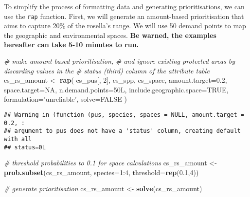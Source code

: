\documentclass[11pt,]{article}
\newenvironment{Shaded}{\begin{snugshade}}{\end{snugshade}}
\newcommand{\KeywordTok}[1]{\textcolor[rgb]{0.13,0.29,0.53}{\textbf{{#1}}}}
\newcommand{\DataTypeTok}[1]{\textcolor[rgb]{0.13,0.29,0.53}{{#1}}}
\newcommand{\DecValTok}[1]{\textcolor[rgb]{0.00,0.00,0.81}{{#1}}}
\newcommand{\FloatTok}[1]{\textcolor[rgb]{0.00,0.00,0.81}{{#1}}}
\newcommand{\StringTok}[1]{\textcolor[rgb]{0.31,0.60,0.02}{{#1}}}
\newcommand{\CommentTok}[1]{\textcolor[rgb]{0.56,0.35,0.01}{\textit{{#1}}}}
\newcommand{\OtherTok}[1]{\textcolor[rgb]{0.56,0.35,0.01}{{#1}}}
\newcommand{\NormalTok}[1]{{#1}}
\begin{document}
To simplify the process of formatting data and generating
prioritisations, we can use the \texttt{rap} function. First, we will
generate an amount-based prioritisation that aims to capture 20\% of the
rosella's range. We will use 50 demand points to map the geographic and
environmental spaces. \textbf{Be warned, the examples hereafter can take
5-10 minutes to run.}

\begin{Shaded}
\begin{Highlighting}[]
\CommentTok{# make amount-based prioritisation,}
\CommentTok{# and ignore existing protected areas by discarding values in the }
\CommentTok{# status (third) column of the attribute table}
\NormalTok{cs_rs_amount <-}\StringTok{ }\KeywordTok{rap}\NormalTok{(}
    \NormalTok{cs_pus[,-}\DecValTok{2}\NormalTok{], cs_spp, cs_space,}
  \DataTypeTok{amount.target=}\FloatTok{0.2}\NormalTok{, }\DataTypeTok{space.target=}\OtherTok{NA}\NormalTok{, }\DataTypeTok{n.demand.points=}\NormalTok{50L,}
  \DataTypeTok{include.geographic.space=}\OtherTok{TRUE}\NormalTok{, }\DataTypeTok{formulation=}\StringTok{'unreliable'}\NormalTok{,}
  \DataTypeTok{solve=}\OtherTok{FALSE}
\NormalTok{)}
\end{Highlighting}
\end{Shaded}

\begin{verbatim}
## Warning in (function (pus, species, spaces = NULL, amount.target = 0.2, :
## argument to pus does not have a 'status' column, creating default with all
## status=0L
\end{verbatim}

\begin{Shaded}
\begin{Highlighting}[]
\CommentTok{# threshold probabilities to 0.1 for space calculations}
\NormalTok{cs_rs_amount <-}\StringTok{ }\KeywordTok{prob.subset}\NormalTok{(cs_rs_amount, }\DataTypeTok{species=}\DecValTok{1}\NormalTok{:}\DecValTok{4}\NormalTok{, }\DataTypeTok{threshold=}\KeywordTok{rep}\NormalTok{(}\FloatTok{0.1}\NormalTok{,}\DecValTok{4}\NormalTok{))}
\end{Highlighting}
\end{Shaded}

\begin{Shaded}
\begin{Highlighting}[]
\CommentTok{# generate prioritisation}
\NormalTok{cs_rs_amount <-}\StringTok{ }\KeywordTok{solve}\NormalTok{(cs_rs_amount)}
\end{Highlighting}
\end{Shaded}
\end{document}
